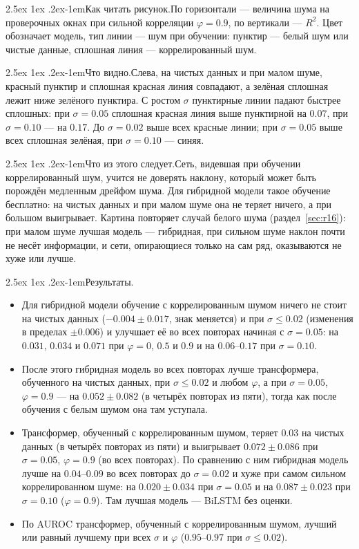 \documentclass[12pt,a4paper]{report}
\makeatletter
\renewcommand\paragraph{\@startsection{paragraph}{4}{\z@}%
  {2.5ex \@plus1ex \@minus.2ex}{-1em}{\normalfont\normalsize\bfseries}}
\numberwithin{equation}{chapter}
\newcommand{\figread}{\paragraph{Как читать рисунок.}}
\newcommand{\figsee}{\paragraph{Что видно.}}
\newcommand{\figgen}{\paragraph{Что из этого следует.}}
\makeatother
\begin{document}
\figread По горизонтали --- величина шума на проверочных окнах при сильной
корреляции $\varphi=0.9$, по вертикали --- $R^2$. Цвет обозначает модель,
тип линии --- шум при обучении: пунктир --- белый шум или чистые данные,
сплошная линия --- коррелированный шум.

\figsee Слева, на чистых данных и при малом шуме, красный пунктир и
сплошная красная линия совпадают, а зелёная сплошная лежит ниже зелёного
пунктира. С ростом $\sigma$ пунктирные линии падают быстрее сплошных: при
$\sigma=0.05$ сплошная красная линия выше пунктирной на $0.07$, при
$\sigma=0.10$ --- на $0.17$. До $\sigma=0.02$ выше всех красные линии; при
$\sigma=0.05$ выше всех сплошная зелёная, при $\sigma=0.10$ --- синяя.

\figgen Сеть, видевшая при обучении коррелированный шум, учится не
доверять наклону, который может быть порождён медленным дрейфом шума. Для
гибридной модели такое обучение бесплатно: на чистых данных и при малом
шуме она не теряет ничего, а при большом выигрывает. Картина повторяет
случай белого шума (раздел~\ref{sec:r16}): при малом шуме лучшая модель ---
гибридная, при сильном шуме наклон почти не несёт информации, и сети,
опирающиеся только на сам ряд, оказываются не хуже или лучше.


\paragraph{Результаты.}
\begin{itemize}
\item Для гибридной модели обучение с коррелированным шумом ничего не
      стоит на чистых данных ($-0.004\pm0.017$, знак меняется) и при
      $\sigma\le0.02$ (изменения в пределах $\pm0.006$) и улучшает её во
      всех повторах начиная с $\sigma=0.05$: на $0.031$, $0.034$ и $0.071$
      при $\varphi=0$, $0.5$ и $0.9$ и на $0.06$--$0.17$ при $\sigma=0.10$.
\item После этого гибридная модель во всех повторах лучше трансформера,
      обученного на чистых данных, при $\sigma\le0.02$ и любом $\varphi$, а
      при $\sigma=0.05$, $\varphi=0.9$ --- на $0.052\pm0.082$ (в четырёх
      повторах из пяти), тогда как после обучения с белым шумом она там
      уступала.
\item Трансформер, обученный с коррелированным шумом, теряет $0.03$ на
      чистых данных (в четырёх повторах из пяти) и выигрывает
      $0.072\pm0.086$ при $\sigma=0.05$, $\varphi=0.9$ (во всех повторах).
      По сравнению с ним гибридная модель лучше на $0.04$--$0.09$ во всех
      повторах до $\sigma=0.02$ и хуже при самом сильном коррелированном
      шуме: на $0.020\pm0.034$ при $\sigma=0.05$ и на $0.087\pm0.023$ при
      $\sigma=0.10$ ($\varphi=0.9$). Там лучшая модель --- BiLSTM без
      оценки.
\item По AUROC трансформер, обученный с коррелированным шумом, лучший или
      равный лучшему при всех $\sigma$ и $\varphi$ ($0.95$--$0.97$ при
      $\sigma\le0.02$).
\end{itemize}
\end{document}
